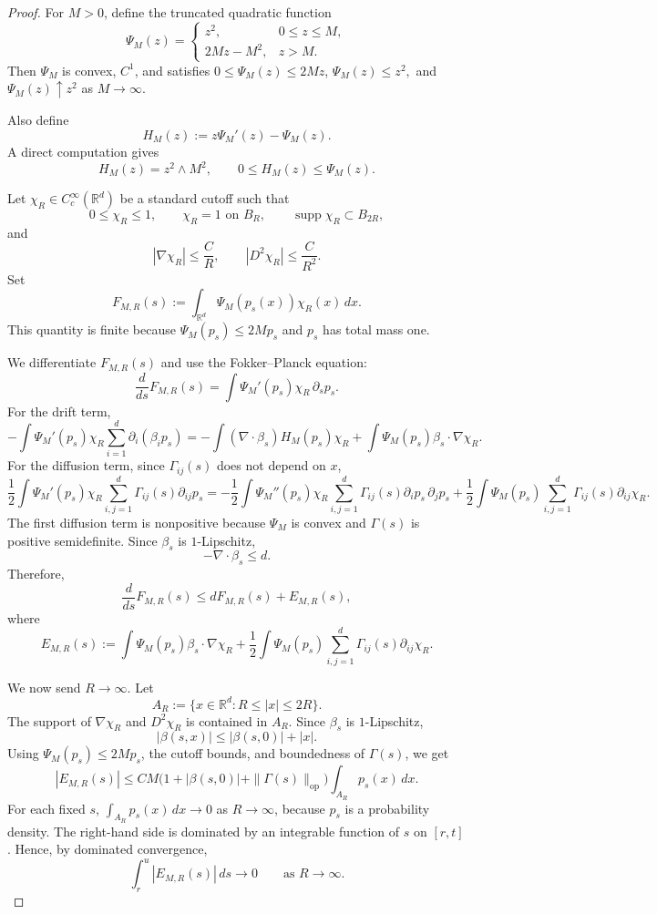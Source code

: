 \documentclass[10pt,a4paper]{amsart}
\def\to{\rightarrow}
\begin{document}
\begin{proof}
For $M>0$, define the truncated quadratic function
\[
\Psi_M(z)
=
\begin{cases}
z^2, & 0\le z\le M,\\
2Mz-M^2, & z>M.
\end{cases}
\]
Then $\Psi_M$ is convex, $C^1$, and satisfies
$
0\le \Psi_M(z)\le 2Mz$,
$\Psi_M(z)\le z^2,
$
and $\Psi_M(z)\uparrow z^2$ as $M\to\infty$.


Also define
\[
H_M(z):=z\Psi_M'(z)-\Psi_M(z).
\]
A direct computation gives
\[
H_M(z)=z^2\wedge M^2,
\qquad
0\le H_M(z)\le \Psi_M(z).
\]

Let $\chi_R\in C_c^\infty(\mathbb R^d)$ be a standard cutoff such that
\[
0\le \chi_R\le 1,\qquad
\chi_R=1 \text{ on } B_R,\qquad
\operatorname{supp}\chi_R\subset B_{2R},
\]
and
\[
|\nabla \chi_R|\le \frac{C}{R},
\qquad
|D^2\chi_R|\le \frac{C}{R^2}.
\]
Set
\[
F_{M,R}(s):=\int_{\mathbb R^d}\Psi_M(p_s(x))\chi_R(x)\,dx.
\]
This quantity is finite because $\Psi_M(p_s)\le 2Mp_s$ and $p_s$ has total
mass one.

We differentiate $F_{M,R}(s)$ and use the Fokker--Planck equation:
\[
\frac{d}{ds}F_{M,R}(s)
=
\int \Psi_M'(p_s)\chi_R\,\partial_s p_s.
\]
For the drift term,
\[
-\int \Psi_M'(p_s)\chi_R
\sum_{i=1}^d \partial_i(\beta_i p_s)
=
-\int (\nabla\cdot \beta_s)H_M(p_s)\chi_R
+
\int \Psi_M(p_s)\beta_s\cdot\nabla\chi_R.
\]
For the diffusion term, since $\Gamma_{ij}(s)$ does not depend on $x$,
\[
\frac12
\int \Psi_M'(p_s)\chi_R
\sum_{i,j=1}^d \Gamma_{ij}(s)\partial_{ij}p_s
=
-\frac12
\int \Psi_M''(p_s)\chi_R
\sum_{i,j=1}^d \Gamma_{ij}(s)\partial_i p_s\,\partial_j p_s
+
\frac12
\int \Psi_M(p_s)
\sum_{i,j=1}^d \Gamma_{ij}(s)\partial_{ij}\chi_R.
\]
The first diffusion term is nonpositive because $\Psi_M$ is convex and
$\Gamma(s)$ is positive semidefinite. Since $\beta_s$ is $1$-Lipschitz,
\[
-\nabla\cdot\beta_s\le d.
\]
Therefore,
\[
\frac{d}{ds}F_{M,R}(s)
\le
dF_{M,R}(s)+E_{M,R}(s),
\]
where
\[
E_{M,R}(s)
:=
\int \Psi_M(p_s)\beta_s\cdot\nabla\chi_R
+
\frac12
\int \Psi_M(p_s)
\sum_{i,j=1}^d \Gamma_{ij}(s)\partial_{ij}\chi_R.
\]

We now send $R\to\infty$. Let
\[
A_R:=\{x\in\mathbb R^d:R\le |x|\le 2R\}.
\]
The support of $\nabla\chi_R$ and $D^2\chi_R$ is contained in $A_R$. Since
$\beta_s$ is $1$-Lipschitz,
\[
|\beta(s,x)|\le |\beta(s,0)|+|x|.
\]
Using $\Psi_M(p_s)\le 2Mp_s$, the cutoff bounds, and boundedness of $\Gamma(s)$,
we get
\[
|E_{M,R}(s)|
\le
C M\bigl(1+|\beta(s,0)|+\|\Gamma(s)\|_{\mathrm{op}}\bigr)
\int_{A_R}p_s(x)\,dx.
\]
For each fixed $s$, $\int_{A_R}p_s(x)\,dx\to0$ as $R\to\infty$, because
$p_s$ is a probability density. The right-hand side is dominated by an
integrable function of $s$ on $[r,t]$. Hence, by dominated convergence,
\[
\int_r^u |E_{M,R}(s)|\,ds\to0
\qquad\text{as }R\to\infty.
\]


\end{proof}
\end{document}
